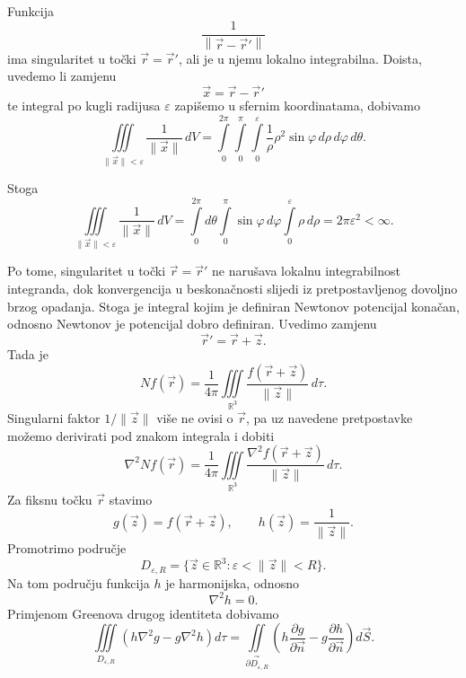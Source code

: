 \documentclass[12pt,a4paper]{article}
\makeatletter
\renewenvironment{proof}[1][\proofname]{\par
  \pushQED{\qed}%
  \normalfont
  \topsep6\p@\@plus6\p@\relax
  \trivlist
  \item[\hskip\labelsep
  \bfseries #1\@addpunct{.}]\ignorespaces
}{%
  \popQED\endtrivlist\@endpefalse
}
\makeatother
\begin{document}
\begin{proof}
Funkcija
\[
\frac{1}{\left\lVert
\overrightarrow{r}-\overrightarrow{r}'
\right\rVert}
\]
ima singularitet u točki
$\overrightarrow{r}=\overrightarrow{r}'$,
ali je u njemu lokalno integrabilna. Doista, uvedemo li zamjenu
\[
\overrightarrow{x}
=
\overrightarrow{r}-\overrightarrow{r}'
\]
te integral po kugli radijusa $\varepsilon$ zapišemo u sfernim koordinatama, dobivamo
\[
\iiint\limits_{\|\overrightarrow{x}\|<\varepsilon}
\frac{1}{\|\overrightarrow{x}\|}\,dV
=
\int\limits_0^{2\pi}
\int\limits_0^\pi
\int\limits_0^\varepsilon
\frac{1}{\rho}\rho^2\sin\varphi
\,d\rho\,d\varphi\,d\theta.
\]

Stoga
\[
\iiint\limits_{\|\overrightarrow{x}\|<\varepsilon}
\frac{1}{\|\overrightarrow{x}\|}\,dV
=
\int\limits_0^{2\pi} d\theta
\int\limits_0^\pi \sin\varphi\,d\varphi
\int\limits_0^\varepsilon \rho\,d\rho
=
2\pi\varepsilon^2
<
\infty.
\]

Po tome, singularitet u točki
$\overrightarrow{r}=\overrightarrow{r}'$
ne narušava lokalnu integrabilnost integranda, dok konvergencija u beskonačnosti
slijedi iz pretpostavljenog dovoljno brzog opadanja. Stoga je integral
kojim je definiran Newtonov potencijal konačan, odnosno Newtonov je potencijal
dobro definiran.  Uvedimo zamjenu
\[
\overrightarrow{r}'
=
\overrightarrow{r}+\overrightarrow{z}.
\]
Tada je
\[
Nf(\overrightarrow{r})
=
\frac{1}{4\pi}
\iiint\limits_{\mathbb{R}^3}
\frac{f(\overrightarrow{r}+\overrightarrow{z})}
{\|\overrightarrow{z}\|}\,d\tau.
\]
Singularni faktor \(1/\|\overrightarrow{z}\|\) više ne ovisi o
\(\overrightarrow{r}\), pa uz navedene pretpostavke možemo derivirati pod
znakom integrala i dobiti
\[
\nabla^2Nf(\overrightarrow{r})
=
\frac{1}{4\pi}
\iiint\limits_{\mathbb{R}^3}
\frac{\nabla^2f(\overrightarrow{r}+\overrightarrow{z})}
{\|\overrightarrow{z}\|}\,d\tau.
\]
Za fiksnu točku \(\overrightarrow{r}\) stavimo
\[
g(\overrightarrow{z})
=
f(\overrightarrow{r}+\overrightarrow{z}),
\qquad
h(\overrightarrow{z})
=
\frac{1}{\|\overrightarrow{z}\|}.
\]
Promotrimo područje
\[
D_{\varepsilon,R}
=
\{\overrightarrow{z}\in\mathbb{R}^3:
\varepsilon<\|\overrightarrow{z}\|<R\}.
\]
Na tom području funkcija \(h\) je harmonijska, odnosno
\[
\nabla^2h=0.
\]
Primjenom Greenova drugog identiteta dobivamo
\[
\iiint\limits_{D_{\varepsilon,R}}
\left(
h\nabla^2g-g\nabla^2h
\right)d\tau
=
\iint\limits_{\overset{\curvearrowright}{\partial D_{\varepsilon,R}}}
\left(
h\frac{\partial g}{\partial \overrightarrow{n}}
-
g\frac{\partial h}{\partial \overrightarrow{n}}
\right)d\overrightarrow{S}.
\]


\end{proof}
\end{document}
